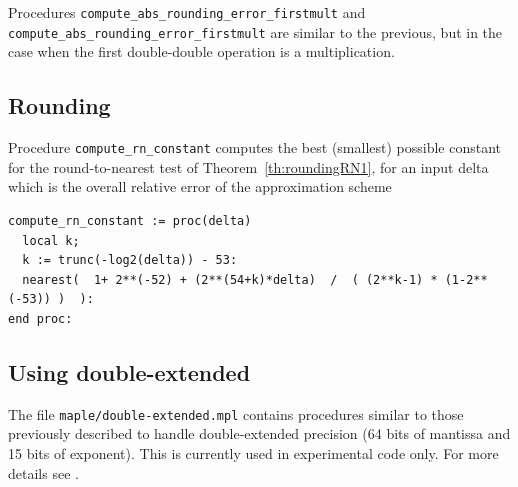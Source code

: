 Procedures \texttt{compute\_abs\_rounding\_error\_firstmult} and
\texttt{compute\_abs\_rounding\_error\_firstmult} are similar to the
previous, but in the case when the first double-double operation is a
multiplication.



\subsection{Rounding}

Procedure \texttt{compute\_rn\_constant} computes the best (smallest)
possible constant for the round-to-nearest test of
Theorem~\ref{th:roundingRN1}, for an input delta which is the overall
relative error of the approximation scheme

\begin{lstlisting}[caption={compute\_rn\_constant},firstnumber=1]
compute_rn_constant := proc(delta)
  local k;
  k := trunc(-log2(delta)) - 53: 
  nearest(  1+ 2**(-52) + (2**(54+k)*delta)  /  ( (2**k-1) * (1-2**(-53)) )  ):
end proc:
\end{lstlisting}
\vspace{0.5cm}



\subsection{Using double-extended}

The file \texttt{maple/double-extended.mpl} contains procedures
similar to those previously described to handle double-extended
precision (64 bits of mantissa and 15 bits of exponent). This is
currently used in experimental code only. For more details see
\cite{DinDefLau2004LIP,DinGast2005}.
